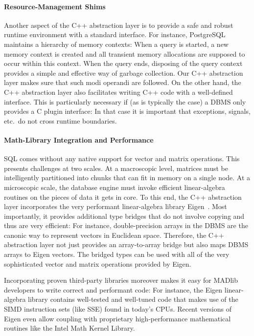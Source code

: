 \paragraph{Resource-Management Shims}

Another aspect of the C++ abstraction layer is to provide a safe and robust runtime environment with a standard interface. For instance, PostgreSQL maintains a hierarchy of memory contexts: When a query is started, a new memory context is created and all transient memory allocations are supposed to occur within this context. When the query ends, disposing of the query context provides a simple and effective way of garbage collection. Our C++ abstraction layer makes sure that such modi operandi are followed. On the other hand, the C++ abstraction layer also facilitates writing C++ code with a well-defined interface. This is particularly necessary if (as is typically the case) a DBMS only provides a C plugin interface: In that case it is important that exceptions, signals, etc.\ do not cross runtime boundaries.

\paragraph{Math-Library Integration and Performance}

SQL comes without any native support for vector and matrix operations. This presents challenges at two scales. At a macroscopic level, matrices must be intelligently partitioned into chunks that can fit in memory on a single node. At a microscopic scale, the database engine must invoke efficient linear-algebra routines on the pieces of data it gets in core. To this end, the C++ abstraction layer incorporates the very performant linear-algebra library Eigen~\cite{eigen}. Most importantly, it provides additional type bridges that do not involve copying and thus are very efficient: For instance, double-precision arrays in the DBMS are the canonic way to represent vectors in Euclidean space. Therefore, the C++ abstraction layer not just provides an array-to-array bridge but also maps DBMS arrays to Eigen vectors. The bridged types can be used with all of the very sophisticated vector and matrix operations provided by Eigen.

Incorporating proven third-party libraries moreover makes it easy for MADlib developers to write correct and performant code: For instance, the Eigen linear-algebra library contains well-tested and well-tuned code that makes use of the SIMD instruction sets (like SSE) found in today's CPUs. Recent versions of Eigen even allow coupling with proprietary high-performance mathematical routines like the Intel Math Kernel Library.

